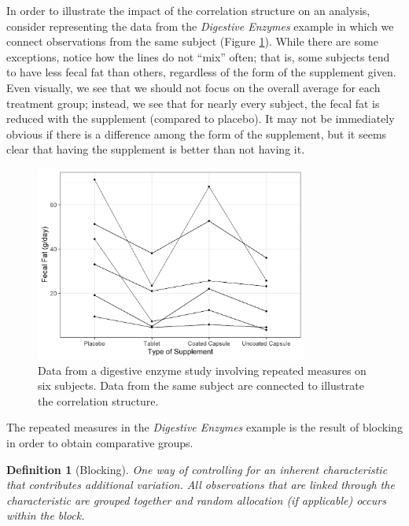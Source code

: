 \documentclass[
]{book}
\theoremstyle{plain}
\theoremstyle{mydefn}
\newtheorem{definition}{Definition}[chapter]
\theoremstyle{myexmpl}
\theoremstyle{remark}
\begin{document}
In order to illustrate the impact of the correlation structure on an analysis, consider representing the data from the \emph{Digestive Enzymes} example in which we connect observations from the same subject (Figure \ref{fig:rm-terminology-enzyme-plot-extended}). While there are some exceptions, notice how the lines do not ``mix'' often; that is, some subjects tend to have less fecal fat than others, regardless of the form of the supplement given. Even visually, we see that we should not focus on the overall average for each treatment group; instead, we see that for nearly every subject, the fecal fat is reduced with the supplement (compared to placebo). It may not be immediately obvious if there is a difference among the form of the supplement, but it seems clear that having the supplement is better than not having it.

\begin{figure}

{\centering \includegraphics[width=0.8\textwidth]{./Images/rm-terminology-enzyme-plot-extended-1} 

}

\caption{Data from a digestive enzyme study involving repeated measures on six subjects.  Data from the same subject are connected to illustrate the correlation structure.}\label{fig:rm-terminology-enzyme-plot-extended}
\end{figure}

The repeated measures in the \emph{Digestive Enzymes} example is the result of blocking in order to obtain comparative groups.

\begin{definition}[Blocking]
\protect\hypertarget{def:defn-blocking}{}{\label{def:defn-blocking} {} }One way of controlling for an inherent characteristic that contributes additional variation. All observations that are linked through the characteristic are grouped together and random allocation (if applicable) occurs within the block.
\end{definition}
\end{document}

